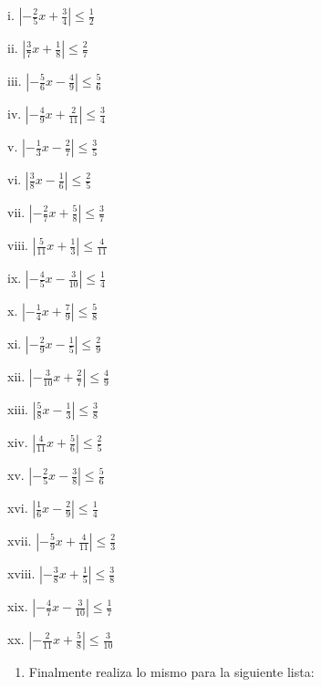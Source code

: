 \documentclass[]{book}
\providecommand{\tightlist}{%
  \setlength{\itemsep}{0pt}\setlength{\parskip}{0pt}}
\begin{document}
\begin{multicols}{2}
    i. $|-\frac{2}{5}x+\frac{3}{4}| \leq \frac{1}{2}$
    
    ii. $|\frac{3}{7}x+\frac{1}{8}| \leq \frac{2}{7}$
    
    iii. $|-{\frac{5}{6}x-\frac{4}{9}}| \leq \frac{5}{6}$
    
    iv. $|-\frac{4}{9}x+\frac{2}{11}| \leq \frac{3}{4}$
    
    v. $|-\frac{1}{3}x-\frac{2}{7}| \leq \frac{3}{5}$
    
    vi. $|\frac{3}{8}x-\frac{1}{6}| \leq \frac{2}{5}$
    
    vii. $|-{\frac{2}{7}x+\frac{5}{8}}| \leq \frac{3}{7}$
    
    viii. $|\frac{5}{11}x+\frac{1}{3}| \leq \frac{4}{11}$
    
    ix. $|-\frac{4}{5}x-\frac{3}{10}| \leq \frac{1}{4}$
    
    x. $|-\frac{1}{4}x+\frac{7}{9}| \leq \frac{5}{8}$
    
    xi. $|-{\frac{2}{9}x-\frac{1}{5}}| \leq \frac{2}{9}$
    
    xii. $|-\frac{3}{10}x+\frac{2}{7}| \leq \frac{4}{9}$
    
    xiii. $|\frac{5}{8}x-\frac{1}{3}| \leq \frac{3}{8}$
    
    xiv. $|\frac{4}{11}x+\frac{5}{6}| \leq \frac{2}{5}$
    
    xv. $|-\frac{2}{5}x-\frac{3}{8}| \leq \frac{5}{6}$
    
    xvi. $|\frac{1}{6}x-\frac{2}{9}| \leq \frac{1}{4}$
    
    xvii. $|-{\frac{5}{9}x+\frac{4}{11}}| \leq \frac{2}{3}$
    
    xviii. $|-\frac{3}{8}x+\frac{1}{5}| \leq \frac{3}{8}$
    
    xix. $|-\frac{4}{7}x-\frac{3}{10}| \leq \frac{1}{7}$
    
    xx. $|-\frac{2}{11}x+\frac{5}{8}| \leq \frac{3}{10}$
\end{multicols}

\begin{enumerate}
\def\labelenumi{\arabic{enumi}.}
\setcounter{enumi}{2}
\tightlist
\item
  Finalmente realiza lo mismo para la siguiente lista:
\end{enumerate}
\end{document}
